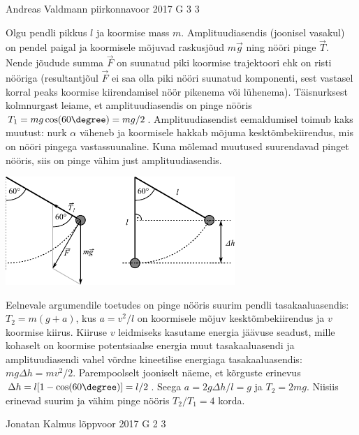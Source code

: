 \documentclass[11pt]{article}
\begin{document}
{%
{Andreas Valdmann} %
{piirkonnavoor} %
{2017} %
{G 3} %
{3} %
{

\ifSolution
Olgu pendli pikkus $l$ ja koormise mass $m$. Amplituudiasendis (joonisel vasakul) on pendel paigal ja koormisele mõjuvad raskusjõud $m\vec{g}$ ning nööri pinge $\vec{T}$. Nende jõudude summa $\vec{F}$ on suunatud piki koormise trajektoori ehk on risti nööriga (resultantjõul $\vec{F}$ ei saa olla piki nööri suunatud komponenti, sest vastasel korral peaks koormise kiirendamisel nöör pikenema või lühenema). Täisnurksest kolmnurgast leiame, et amplituudiasendis on pinge nööris $T_1 = mg\cos(60\degree) = mg / 2$. Amplituudiasendist eemaldumisel toimub kaks muutust: nurk $\alpha$ väheneb ja koormisele hakkab mõjuma kesktõmbekiirendus, mis on nööri pingega vastassuunaline. Kuna mõlemad muutused suurendavad pinget nööris, siis on pinge vähim just amplituudiasendis.

\begin{center}
	\vspace{-10pt}
	\includegraphics[width=0.65\textwidth]{2017-v2g-03-pendel-joonis.pdf}
	\vspace{-15pt}
\end{center}

Eelnevale argumendile toetudes on pinge nööris suurim pendli tasakaaluasendis: $T_2 = m(g + a)$, kus $a = v^2 / l$ on koormisele mõjuv kesktõmbekiirendus ja $v$ koormise kiirus. Kiiruse $v$ leidmiseks kasutame energia jäävuse seadust, mille kohaselt on koormise potentsiaalse energia muut tasakaaluasendi ja amplituudiasendi vahel võrdne kineetilise energiaga tasakaaluasendis: $mg\Delta h = mv^2 / 2$. Parempoolselt jooniselt näeme, et kõrguste erinevus $\Delta h = l[1-\cos(60\degree)] = l / 2$. Seega $a = 2g\Delta h / l = g$ ja $T_2 = 2mg$. Niisiis erinevad suurim ja vähim pinge nööris $T_2 / T_1 = 4$ korda.
\fi
}

{Jonatan Kalmus} %
{lõppvoor} %
{2017} %
{G 2} %
{3} %
{

}}
\end{document}
